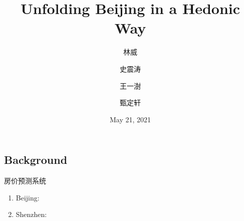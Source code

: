 \documentclass[handout]{beamer}
\begin{document}
\begin{CJK}{UTF8}{gbsn}


\title{Unfolding Beijing in a Hedonic Way}
\author{林威 \and 史震涛 \and 王一澍  \and 甄定轩}
\date{May 21, 2021}

\maketitle

\section{Background}
\begin{frame}
	\sectionpage
\end{frame}



\begin{frame}{房价预测系统}
	\begin{enumerate}
		\item Beijing: 
		\item Shenzhen: 
	\end{enumerate}
\end{frame}




\end{CJK}
\end{document}
